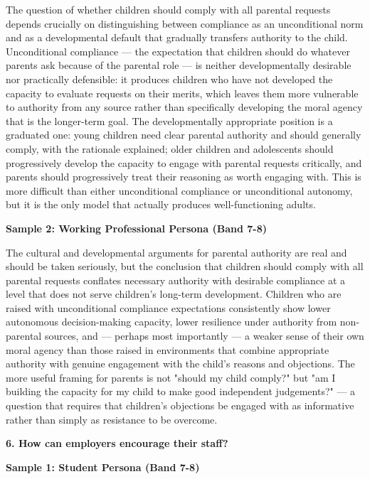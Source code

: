 The question of whether children should comply with all parental requests depends crucially on distinguishing between compliance as an unconditional norm and as a developmental default that gradually transfers authority to the child. Unconditional compliance — the expectation that children should do whatever parents ask because of the parental role — is neither developmentally desirable nor practically defensible: it produces children who have not developed the capacity to evaluate requests on their merits, which leaves them more vulnerable to authority from any source rather than specifically developing the moral agency that is the longer-term goal. The developmentally appropriate position is a graduated one: young children need clear parental authority and should generally comply, with the rationale explained; older children and adolescents should progressively develop the capacity to engage with parental requests critically, and parents should progressively treat their reasoning as worth engaging with. This is more difficult than either unconditional compliance or unconditional autonomy, but it is the only model that actually produces well-functioning adults.

\textbf{Sample 2: Working Professional Persona (Band 7-8)}

The cultural and developmental arguments for parental authority are real and should be taken seriously, but the conclusion that children should comply with all parental requests conflates necessary authority with desirable compliance at a level that does not serve children's long-term development. Children who are raised with unconditional compliance expectations consistently show lower autonomous decision-making capacity, lower resilience under authority from non-parental sources, and — perhaps most importantly — a weaker sense of their own moral agency than those raised in environments that combine appropriate authority with genuine engagement with the child's reasons and objections. The more useful framing for parents is not "should my child comply?" but "am I building the capacity for my child to make good independent judgements?" — a question that requires that children's objections be engaged with as informative rather than simply as resistance to be overcome.

\separator

\begin{ieltsquestion}
\textbf{6. How can employers encourage their staff?}
\end{ieltsquestion}
\textbf{Sample 1: Student Persona (Band 7-8)}


